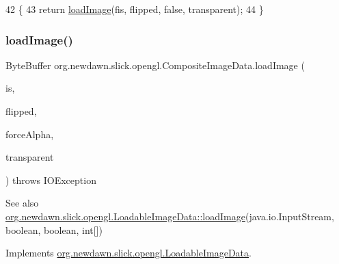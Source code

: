 \begin{DoxyCode}
42                                                                                                         \{
43         \textcolor{keywordflow}{return} \mbox{\hyperlink{classorg_1_1newdawn_1_1slick_1_1opengl_1_1_composite_image_data_afac01aa86b627c3e172aeb7e66ec2b2f}{loadImage}}(fis, flipped, \textcolor{keyword}{false}, transparent);
44     \}
\end{DoxyCode}
\mbox{\label{classorg_1_1newdawn_1_1slick_1_1opengl_1_1_composite_image_data_abdc1f3d531423e34b3f8a04e4854e5c5}} 
\subsubsection{\texorpdfstring{load\+Image()}{loadImage()}\hspace{0.1cm}{\footnotesize\ttfamily [3/3]}}
{\footnotesize\ttfamily Byte\+Buffer org.\+newdawn.\+slick.\+opengl.\+Composite\+Image\+Data.\+load\+Image (\begin{DoxyParamCaption}\item[{Input\+Stream}]{is,  }\item[{boolean}]{flipped,  }\item[{boolean}]{force\+Alpha,  }\item[{int \mbox{[}$\,$\mbox{]}}]{transparent }\end{DoxyParamCaption}) throws I\+O\+Exception\hspace{0.3cm}{\ttfamily [inline]}}

\begin{DoxySeeAlso}{See also}
\mbox{\hyperlink{interfaceorg_1_1newdawn_1_1slick_1_1opengl_1_1_loadable_image_data_a640021b955dde7deeeeabb5ac3738d2b}{org.\+newdawn.\+slick.\+opengl.\+Loadable\+Image\+Data\+::load\+Image}}(java.\+io.\+Input\+Stream, boolean, boolean, int\mbox{[}\mbox{]}) 
\end{DoxySeeAlso}


Implements \mbox{\hyperlink{interfaceorg_1_1newdawn_1_1slick_1_1opengl_1_1_loadable_image_data_ae1be205b86c674550235e9f357adadf5}{org.\+newdawn.\+slick.\+opengl.\+Loadable\+Image\+Data}}.


